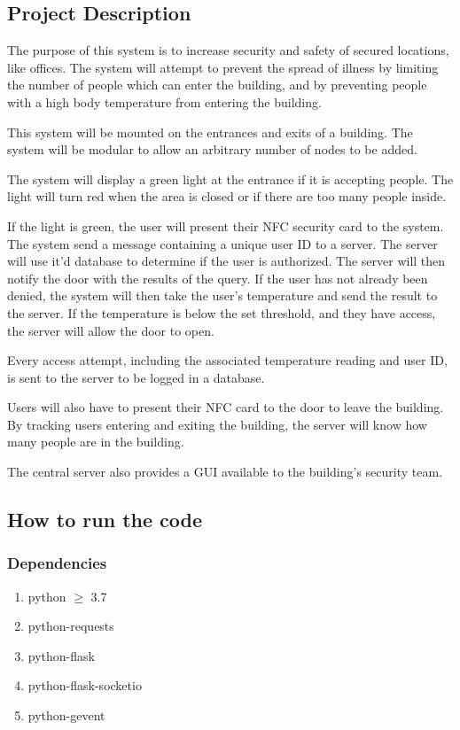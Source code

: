 \subsection{Project Description}

The purpose of this system is to increase security and safety of secured
locations, like offices. The system will attempt to prevent the spread of
illness by limiting the number of people which can enter the building, and by
preventing people with a high body temperature from entering the building.

This system will be mounted on the entrances and exits of a building. The system
will be modular to allow an arbitrary number of nodes to be added.

The system will display a green light at the entrance if it is accepting people.
The light will turn red when the area is closed or if there are too many people
inside.

If the light is green, the user will present their NFC security card to the
system. The system send a message containing a unique user ID to a server. The
server will use it’d database to determine if the user is authorized. The server
will then notify the door with the results of the query. If the user has not
already been denied, the system will then take the user’s temperature and send
the result to the server. If the temperature is below the set threshold, and
they have access, the server will allow the door to open.

Every access attempt, including the associated temperature reading and user ID,
is sent to the server to be logged in a database.

Users will also have to present their NFC card to the door to leave the
building. By tracking users entering and exiting the building, the server will
know how many people are in the building.

The central server also provides a GUI available to the building’s security
team.

\subsection{How to run the code}

\subsubsection{Dependencies}

\begin{enumerate}
    \item python $\geq$ 3.7
    \item python-requests
    \item python-flask
    \item python-flask-socketio
    \item python-gevent
\end{enumerate}

